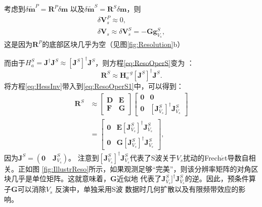 考虑到$\delta \tilde{\mathbf{m}}^P=\mathbf{R}^P\delta \mathbf{m}$ 以及$\delta \tilde{\mathbf{m}}^S=\mathbf{R}^S\delta \mathbf{m}$，则
\begin{equation}
\begin{split}
        \delta \mathbf{V}^P_s\approx0, \\
        \delta \mathbf{V}_s \approx \delta
        \mathbf{V}^S_s=-\mathbf{G}\mathbf{g}^S_{V_s},
        \label{eq:gradGN}
\end{split}
\end{equation}
这是因为$\mathbf{R}^P$的底部区块几乎为空（见图\ref{fig:Resolution}b）

而由于$H^S_a=\mathbf{J}^{\dagger}\mathbf{J}^S\approx[\mathbf{J}^S]^{\dagger}\mathbf{J}^S$，则方程\eqref{eq:ResoOperS}变为
：
\begin{equation}
        \mathbf{R}^S\approx\mathbf{H}^{-g}_a[\mathbf{J}^S]^{\dagger}\mathbf{J}^S.
        \label{eq:ResoOperS1}
\end{equation}
将方程\eqref{eq:HessInv}带入到\eqref{eq:ResoOperS1}中，可以得到：
\begin{equation}
        \begin{split}
        \mathbf{R}^S
        &\approx
    \begin{bmatrix}
                \mathbf{D}&\mathbf{E} \\
                \mathbf{F}&\mathbf{G}
        \end{bmatrix}
    \begin{bmatrix}
        \mathbf{0}&\mathbf{0}\\
        \mathbf{0}&[\mathbf{J}^S_{V_s}]^{\dagger}\mathbf{J}_{V_s}^S
        \end{bmatrix}\\
        &=
    \begin{bmatrix}
                \mathbf{0}&\mathbf{E}[\mathbf{J}^S_{V_s}]^{\dagger}\mathbf{J}^S_{V_s}\\
                \mathbf{0}&\mathbf{G}[\mathbf{J}^S_{V_s}]^{\dagger}\mathbf{J}^S_{V_s}
        \end{bmatrix},
        \end{split}
        \label{eq:ResoOperS2}
\end{equation}
因为$\mathbf{J}^S=(\mathbf{0}\quad\mathbf{J}^S_{V_s})$。
注意到$[\mathbf{J}^S_{V_s}]^{\dagger}\mathbf{J}^S_{V_s}$代表了S波关于$V_s$扰动的Frech{$\acute{e}$}t导数自相关。正如图
\ref{fig:IllustrReso}所示，如果观测足够“完美”，则该分辨率矩阵的对角区块几乎是单位矩阵。这就意味着，$\mathbf{G}$近似地
代表了$\mathbf{J}^S_{V_s}]^{\dagger}\mathbf{J}^S_{V_s}$的逆。因此，预条件算子$\mathbf{G}$可以消除$V_s$ 反演中，单独采用S波
数据时几何扩散以及有限频带效应的影响。
